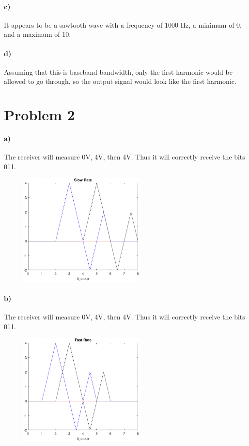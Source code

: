 \documentclass[12pt]{article}
\begin{document}
\paragraph{c)}

It appears to be a sawtooth wave with a frequency of \(1000\) Hz, a minimum of 0, and a maximum of 10.

\paragraph{d)}

Assuming that this is baseband bandwidth, only the first harmonic would be allowed to go through, so the output
signal would look like the first harmonic.

\section*{Problem 2}

\paragraph{a)}

The receiver will measure 0V, 4V, then 4V. Thus it will correctly receive the bits 011.
\begin{figure}[H]
    \begin{center}
        \includegraphics[width=2.5in]{problem2a.pdf}
    \end{center}
\end{figure}

\paragraph{b)}

The receiver will measure 0V, 4V, then 4V. Thus it will correctly receive the bits 011.
\begin{figure}[H]
    \begin{center}
        \includegraphics[width=2.5in]{problem2b.pdf}
    \end{center}
\end{figure}
\end{document}
